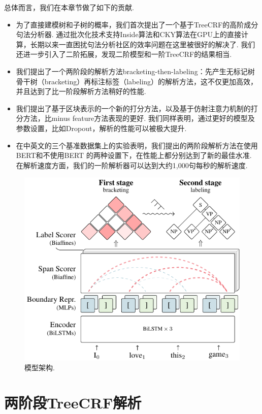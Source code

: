 总体而言，我们在本章节做了如下的贡献.
\begin{itemize}
	\item 为了直接建模树和子树的概率，我们首次提出了一个基于TreeCRF的高阶成分句法分析器.
	      通过批次化技术支持Inside算法和CKY算法在GPU上的直接计算，长期以来一直困扰句法分析社区的效率问题在这里被很好的解决了.
	      我们还进一步引入了二阶拓展，发现二阶模型和一阶TreeCRF的结果相当.
	\item 我们提出了一个两阶段的解析方法bracketing-then-labeling：先产生无标记树骨干树（bracketing）再标注标签（labeling）的解析方法，这不仅更加高效，并且达到了比一阶段解析方法稍好的性能.
	\item 我们提出了基于区块表示的一个新的打分方法，以及基于仿射注意力机制的打分方法，比minus feature方法表现的更好.
	      我们同样表明，通过更好的模型及参数设置，比如Dropout，解析的性能可以被极大提升.
	\item 在中英文的三个基准数据集上的实验表明，我们提出的两阶段解析方法在使用BERT和不使用BERT \citep{devlin-etal-2019-bert}的两种设置下，在性能上都分别达到了新的最佳水准.
	      在解析速度方面，我们的一阶解析器可以达到大约1,000句每秒的解析速度.
\end{itemize}

\begin{figure}[tb]
	\centering
	\includegraphics [scale=1.1]{figures/con-framework.pdf}
	\caption{模型架构.}
	\label{fig:con-framework}
\end{figure}

\section{两阶段TreeCRF解析}\label{sec:2stage-parsing}

